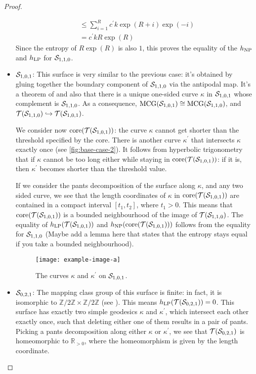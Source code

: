 \documentclass[12pt, reqno]{amsart}
\begin{document}
\begin{proof}
\begin{itemize}
\begin{align*}
                                     &\leq \sum_{i=1}^R c^{\prime}k \exp(R+i) \exp(-i) \\
                                     &= c^{\prime}k R \exp(R)
    \end{align*}
    Since the entropy of $R \exp(R)$ is also $1$, this proves the equality of the $h_{\mathrm{NP}}$ and $h_{\mathrm{LP}}$ for $\mathcal{S}_{1,1,0}$.
  \item $\mathcal{S}_{1,0,1}$: This surface is very similar to the previous case: it's obtained by gluing together the boundary component of $\mathcal{S}_{1,1,0}$ via the antipodal map.
    It's a theorem of \textcite{scharlemann1982complex} and also \textcite{gendulphe2017whats} that there is a unique one-sided curve $\kappa$ in $\mathcal{S}_{1,0,1}$ whose complement is $\mathcal{S}_{1,1,0}$.
    As a consequence, $\mathrm{MCG}(\mathcal{S}_{1,0,1}) \cong \mathrm{MCG}(\mathcal{S}_{1,1,0})$, and $\mathcal{T}(\mathcal{S}_{1,1,0}) \hookrightarrow \mathcal{T}(\mathcal{S}_{1,0,1})$.

    We consider now $\mathrm{core}(\mathcal{T}(\mathcal{S}_{1,0,1}))$: the curve $\kappa$ cannot get shorter than the threshold specified by the core.
    There is another curve $\kappa^{\prime}$ that intersects $\kappa$ exactly once (see \autoref{fig:base-case-2}).
    It follows from hyperbolic trigonometry that if $\kappa$ cannot be too long either while staying in $\mathrm{core}(\mathcal{T}(\mathcal{S}_{1,0,1}))$: if it is, then $\kappa^{\prime}$ becomes shorter than the threshold value.

    If we consider the pants decomposition of the surface along $\kappa$, and any two sided curve, we see that the length coordinates of $\kappa$ in $\mathrm{core}(\mathcal{T}(\mathcal{S}_{1,0,1}))$ are contained in a compact interval $[t_1, t_2]$, where $t_1 > 0$.
    This means that $\mathrm{core}(\mathcal{T}(\mathcal{S}_{1,0,1}))$ is a bounded neighbourhood of the image of $\mathcal{T}(\mathcal{S}_{1,1,0})$.
    The equality of $h_{\mathrm{LP}}(\mathcal{T}(\mathcal{S}_{1,0,1}))$ and $h_{\mathrm{NP}}(\mathrm{core}(\mathcal{T}(\mathcal{S}_{1,0,1})))$ follows from the equality for $\mathcal{S}_{1,1,0}$ {\color{red} (Maybe add a lemma here that states that the entropy stays equal if you take a bounded neighbourhood)}.
    \begin{figure}[h]
      \centering
      \texttt{[image: example-image-a]}
      \caption{The curves $\kappa$ and $\kappa^{\prime}$ on $\mathcal{S}_{1,0,1}$.}
      \label{fig:base-case-2}
    \end{figure}
  \item $\mathcal{S}_{0,2,1}$: The mapping class group of this surface is finite: in fact, it is isomorphic to $\mathbb{Z}/2\mathbb{Z} \times \mathbb{Z}/2\mathbb{Z}$ (see \textcite{gendulphe2017whats}).
    This means $h_{\mathrm{LP}}(\mathcal{T}(\mathcal{S}_{0,2,1})) = 0$.
    This surface has exactly two simple geodesics $\kappa$ and $\kappa^{\prime}$, which intersect each other exactly once, such that deleting either one of them results in a pair of pants.
    Picking a pants decomposition along either $\kappa$ or $\kappa^{\prime}$, we see that $\mathcal{T}(\mathcal{S}_{0,2,1})$ is homeomorphic to $\mathbb{R}_{>0}$, where the homeomorphism is given by the length coordinate.


\end{itemize}
\end{proof}
\end{document}
